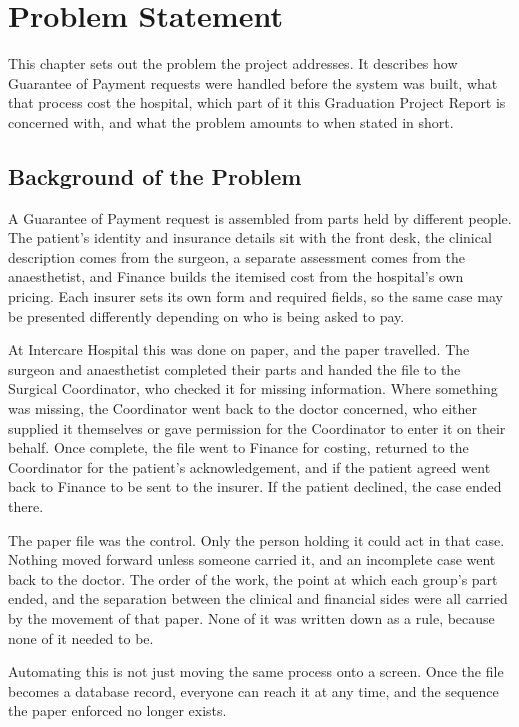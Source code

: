 \chapter{Problem Statement}
\label{chap:ps}

This chapter sets out the problem the project addresses. It describes how Guarantee of Payment requests were handled before the system was built, what that process cost the hospital, which part of it this Graduation Project Report is concerned with, and what the problem amounts to when stated in short.

\section{Background of the Problem}
\label{sec:ps-background}

A Guarantee of Payment request is assembled from parts held by different people. The patient's identity and insurance details sit with the front desk, the clinical description comes from the surgeon, a separate assessment comes from the anaesthetist, and Finance builds the itemised cost from the hospital's own pricing. Each insurer sets its own form and required fields, so the same case may be presented differently depending on who is being asked to pay.

At Intercare Hospital this was done on paper, and the paper travelled. The surgeon and anaesthetist completed their parts and handed the file to the Surgical Coordinator, who checked it for missing information. Where something was missing, the Coordinator went back to the doctor concerned, who either supplied it themselves or gave permission for the Coordinator to enter it on their behalf. Once complete, the file went to Finance for costing, returned to the Coordinator for the patient's acknowledgement, and if the patient agreed went back to Finance to be sent to the insurer. If the patient declined, the case ended there.

The paper file was the control. Only the person holding it could act in that case. Nothing moved forward unless someone carried it, and an incomplete case went back to the doctor. The order of the work, the point at which each group's part ended, and the separation between the clinical and financial sides were all carried by the movement of that paper. None of it was written down as a rule, because none of it needed to be.

Automating this is not just moving the same process onto a screen. Once the file becomes a database record, everyone can reach it at any time, and the sequence the paper enforced no longer exists.


